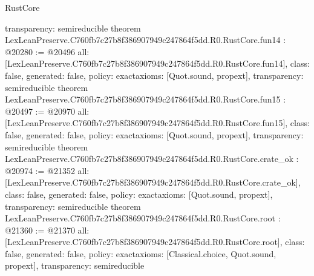 \begin{lexlean}{RustCore}
\begin{coremodule}
{  transparency: semireducible
}
theorem LexLeanPreserve.C760fb7c27b8f386907949c247864f5dd.R0.RustCore.fun14 : @20280 := @20496 {
  all: [LexLeanPreserve.C760fb7c27b8f386907949c247864f5dd.R0.RustCore.fun14],
  class: false,
  generated: false,
  policy: exact{axioms: [Quot.sound, propext]},
  transparency: semireducible
}
theorem LexLeanPreserve.C760fb7c27b8f386907949c247864f5dd.R0.RustCore.fun15 : @20497 := @20970 {
  all: [LexLeanPreserve.C760fb7c27b8f386907949c247864f5dd.R0.RustCore.fun15],
  class: false,
  generated: false,
  policy: exact{axioms: [Quot.sound, propext]},
  transparency: semireducible
}
theorem LexLeanPreserve.C760fb7c27b8f386907949c247864f5dd.R0.RustCore.crate_ok : @20974 := @21352 {
  all: [LexLeanPreserve.C760fb7c27b8f386907949c247864f5dd.R0.RustCore.crate_ok],
  class: false,
  generated: false,
  policy: exact{axioms: [Quot.sound, propext]},
  transparency: semireducible
}
theorem LexLeanPreserve.C760fb7c27b8f386907949c247864f5dd.R0.RustCore.root : @21360 := @21370 {
  all: [LexLeanPreserve.C760fb7c27b8f386907949c247864f5dd.R0.RustCore.root],
  class: false,
  generated: false,
  policy: exact{axioms: [Classical.choice, Quot.sound, propext]},
  transparency: semireducible
}


\end{coremodule}
\end{lexlean}
